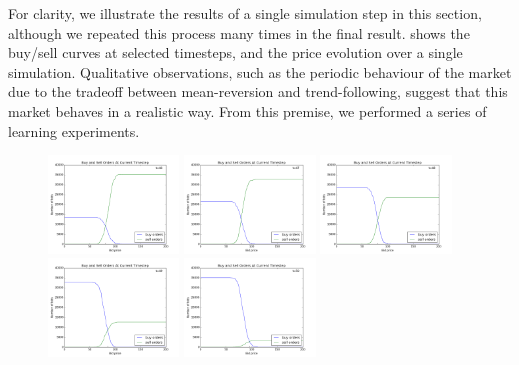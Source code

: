 \documentclass[11pt]{article}
\begin{document}
For clarity, we illustrate the results of a single simulation step in this section, although we repeated this process many times in the final result.  shows the buy/sell curves at selected timesteps, and the price evolution over a single simulation. Qualitative observations, such as the periodic behaviour of the market due to the tradeoff between mean-reversion and trend-following, suggest that this market behaves in a realistic way. From this premise, we performed a series of learning experiments.
\begin{figure}
  \centering
  \quad
  \includegraphics[width=0.31\textwidth]{figures/buy_sell_0046.png}
  \includegraphics[width=0.31\textwidth]{figures/buy_sell_0047.png}
  \includegraphics[width=0.31\textwidth]{figures/buy_sell_0048.png}
  \includegraphics[width=0.31\textwidth]{figures/buy_sell_0049.png}
  \includegraphics[width=0.31\textwidth]{figures/buy_sell_0050.png}

\end{figure}
\end{document}

